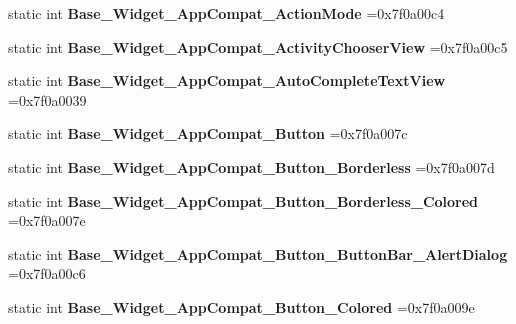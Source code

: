 \begin{DoxyCompactItemize}
static int {\bfseries Base\+\_\+\+Widget\+\_\+\+App\+Compat\+\_\+\+Action\+Mode} =0x7f0a00c4
\item 
\mbox{\label{classandroid_1_1support_1_1v4_1_1R_1_1style_a6296a03dd0a0e6909f07a68801e5c1b8}} 
static int {\bfseries Base\+\_\+\+Widget\+\_\+\+App\+Compat\+\_\+\+Activity\+Chooser\+View} =0x7f0a00c5
\item 
\mbox{\label{classandroid_1_1support_1_1v4_1_1R_1_1style_a7e67450ac63825ddaf831176a9cb73b8}} 
static int {\bfseries Base\+\_\+\+Widget\+\_\+\+App\+Compat\+\_\+\+Auto\+Complete\+Text\+View} =0x7f0a0039
\item 
\mbox{\label{classandroid_1_1support_1_1v4_1_1R_1_1style_a58667798632816ef82659fa1e6b37cd4}} 
static int {\bfseries Base\+\_\+\+Widget\+\_\+\+App\+Compat\+\_\+\+Button} =0x7f0a007c
\item 
\mbox{\label{classandroid_1_1support_1_1v4_1_1R_1_1style_a8f466f492dda9c7277f4703e543061d9}} 
static int {\bfseries Base\+\_\+\+Widget\+\_\+\+App\+Compat\+\_\+\+Button\+\_\+\+Borderless} =0x7f0a007d
\item 
\mbox{\label{classandroid_1_1support_1_1v4_1_1R_1_1style_a62bf8d2538421bf774481222aaebe2ba}} 
static int {\bfseries Base\+\_\+\+Widget\+\_\+\+App\+Compat\+\_\+\+Button\+\_\+\+Borderless\+\_\+\+Colored} =0x7f0a007e
\item 
\mbox{\label{classandroid_1_1support_1_1v4_1_1R_1_1style_afbb319a69d34394ce11101f80e9f2f68}} 
static int {\bfseries Base\+\_\+\+Widget\+\_\+\+App\+Compat\+\_\+\+Button\+\_\+\+Button\+Bar\+\_\+\+Alert\+Dialog} =0x7f0a00c6
\item 
\mbox{\label{classandroid_1_1support_1_1v4_1_1R_1_1style_a03b9f252f07cf20f83c63541f0c6e8b9}} 
static int {\bfseries Base\+\_\+\+Widget\+\_\+\+App\+Compat\+\_\+\+Button\+\_\+\+Colored} =0x7f0a009e
\item 
\mbox{\label{classandroid_1_1support_1_1v4_1_1R_1_1style_a69f6bdcc7830226dee3fdf3005437930}} 

\end{DoxyCompactItemize}
